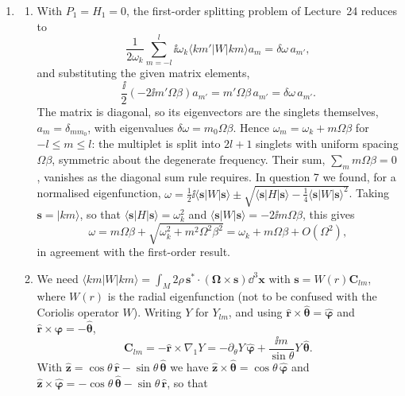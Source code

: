 \documentclass[a4paper,10pt]{paper}
\begin{document}
\begin{enumerate}
\item
\begin{enumerate}
\item With $P_{1}=H_{1}=0$, the first-order splitting problem of Lecture~24 reduces to
\begin{equation*}
    \frac{1}{2\omega_{k}}\sum_{m=-l}^{l}\ii\omega_{k}\langle km'|W|km\rangle a_{m}=\delta\omega\,a_{m'},
\end{equation*}
and substituting the given matrix elements,
\begin{equation*}
    \frac{\ii}{2}(-2\ii m'\Omega\beta)a_{m'}=m'\Omega\beta\,a_{m'}=\delta\omega\,a_{m'}.
\end{equation*}
The matrix is diagonal, so its eigenvectors are the singlets themselves, $a_{m}=\delta_{mm_{0}}$, with eigenvalues $\delta\omega=m_{0}\Omega\beta$. 
Hence $\omega_{m}=\omega_{k}+m\Omega\beta$ for $-l\le m\le l$: the multiplet is split into $2l+1$ singlets with uniform spacing $\Omega\beta$, 
symmetric about the degenerate frequency. Their sum, $\sum_{m}m\Omega\beta=0$, vanishes as the diagonal sum rule requires. In question 7 we found, 
for a normalised eigenfunction, $\omega=\tfrac{1}{2}\ii\langle\mathbf{s}|W|\mathbf{s}\rangle\pm\sqrt{\langle\mathbf{s}|H|\mathbf{s}\rangle-\tfrac{1}{4}\langle\mathbf{s}|W|\mathbf{s}\rangle^{2}}$. 
Taking $\mathbf{s}=|km\rangle$, so that $\langle\mathbf{s}|H|\mathbf{s}\rangle=\omega_{k}^{2}$ and $\langle\mathbf{s}|W|\mathbf{s}\rangle=-2\ii m\Omega\beta$, this gives
\begin{equation*}
    \omega=m\Omega\beta+\sqrt{\omega_{k}^{2}+m^{2}\Omega^{2}\beta^{2}}=\omega_{k}+m\Omega\beta+O(\Omega^{2}),
\end{equation*}
in agreement with the first-order result.
\item We need $\langle km|W|km\rangle=\int_{M}2\rho\,\mathbf{s}^{*}\cdot(\bm{\Omega}\times\mathbf{s})\dd^{3}\mathbf{x}$ with $\mathbf{s}=W(r)\mathbf{C}_{lm}$, where $W(r)$ is the radial eigenfunction (not to be confused with the Coriolis operator $W$). 
Writing $Y$ for $Y_{lm}$, and using $\hat{\mathbf{r}}\times\hat{\bm{\theta}}=\hat{\bm{\varphi}}$ and $\hat{\mathbf{r}}\times\hat{\bm{\varphi}}=-\hat{\bm{\theta}}$,
\begin{equation*}
    \mathbf{C}_{lm}=-\hat{\mathbf{r}}\times\nabla_{1}Y=-\partial_{\theta}Y\,\hat{\bm{\varphi}}+\frac{\ii m}{\sin\theta}Y\,\hat{\bm{\theta}}.
\end{equation*}
With $\hat{\mathbf{z}}=\cos\theta\,\hat{\mathbf{r}}-\sin\theta\,\hat{\bm{\theta}}$ we have 
$\hat{\mathbf{z}}\times\hat{\bm{\theta}}=\cos\theta\,\hat{\bm{\varphi}}$ and $\hat{\mathbf{z}}\times\hat{\bm{\varphi}}=-\cos\theta\,\hat{\bm{\theta}}-\sin\theta\,\hat{\mathbf{r}}$, so that

\end{enumerate}
\end{enumerate}
\end{document}
